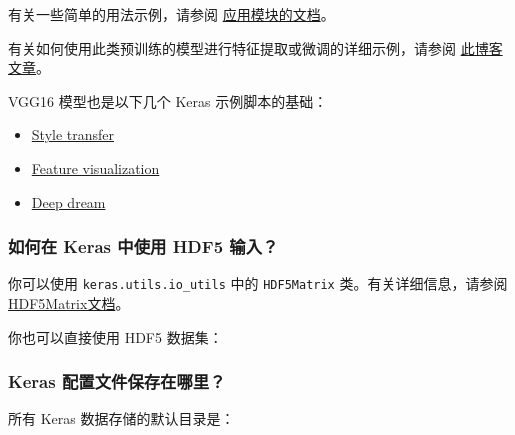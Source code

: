 有关一些简单的用法示例，请参阅 \hyperref[applications]{应用模块的文档}。

有关如何使用此类预训练的模型进行特征提取或微调的详细示例，请参阅
\href{http://blog.keras.io/building-powerful-image-classification-models-using-very-little-data.html}{此博客文章}。

VGG16 模型也是以下几个 Keras 示例脚本的基础：

\begin{itemize}
\tightlist
\item
  \href{https://github.com/keras-team/keras/blob/master/examples/neural_style_transfer.py}{Style
  transfer}
\item
  \href{https://github.com/keras-team/keras/blob/master/examples/conv_filter_visualization.py}{Feature
  visualization}
\item
  \href{https://github.com/keras-team/keras/blob/master/examples/deep_dream.py}{Deep
  dream}
\end{itemize}



\subsubsection{如何在 Keras 中使用 HDF5
输入？}\label{how-can-i-use-hdf5-inputs-with-keras}

你可以使用 \texttt{keras.utils.io\_utils} 中的 \texttt{HDF5Matrix}
类。有关详细信息，请参阅 \hyperref[HDF5Matrix]{HDF5Matrix文档}。

你也可以直接使用 HDF5 数据集：

\begin{Shaded}
\begin{Highlighting}[]
 
 \NormalTok{, }\NormalTok{) } 
    \OperatorTok{=} \NormalTok{f[}\NormalTok{]}
\end{Highlighting}
\end{Shaded}



\subsubsection{Keras
配置文件保存在哪里？}\label{where-is-the-keras-configuration-file-stored}

所有 Keras 数据存储的默认目录是：

